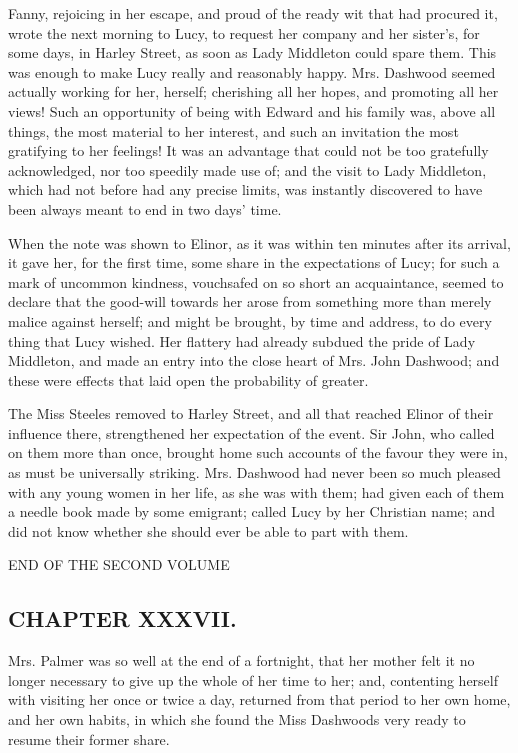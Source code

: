 Fanny, rejoicing in her escape, and proud of the ready wit that had procured it, wrote the next morning to Lucy, to request her company and her sister's, for some days, in Harley Street, as soon as Lady Middleton could spare them. This was enough to make Lucy really and reasonably happy. Mrs. Dashwood seemed actually working for her, herself; cherishing all her hopes, and promoting all her views! Such an opportunity of being with Edward and his family was, above all things, the most material to her interest, and such an invitation the most gratifying to her feelings! It was an advantage that could not be too gratefully acknowledged, nor too speedily made use of; and the visit to Lady Middleton, which had not before had any precise limits, was instantly discovered to have been always meant to end in two days' time.

When the note was shown to Elinor, as it was within ten minutes after its arrival, it gave her, for the first time, some share in the expectations of Lucy; for such a mark of uncommon kindness, vouchsafed on so short an acquaintance, seemed to declare that the good-will towards her arose from something more than merely malice against herself; and might be brought, by time and address, to do every thing that Lucy wished. Her flattery had already subdued the pride of Lady Middleton, and made an entry into the close heart of Mrs. John Dashwood; and these were effects that laid open the probability of greater.

The Miss Steeles removed to Harley Street, and all that reached Elinor of their influence there, strengthened her expectation of the event. Sir John, who called on them more than once, brought home such accounts of the favour they were in, as must be universally striking. Mrs. Dashwood had never been so much pleased with any young women in her life, as she was with them; had given each of them a needle book made by some emigrant; called Lucy by her Christian name; and did not know whether she should ever be able to part with them.

END OF THE SECOND VOLUME

\subsection[chapter-xxxvii.]{\useURL[url37][][][]\from[url37]CHAPTER XXXVII.}

Mrs. Palmer was so well at the end of a fortnight, that her mother felt it no longer necessary to give up the whole of her time to her; and, contenting herself with visiting her once or twice a day, returned from that period to her own home, and her own habits, in which she found the Miss Dashwoods very ready to resume their former share.

